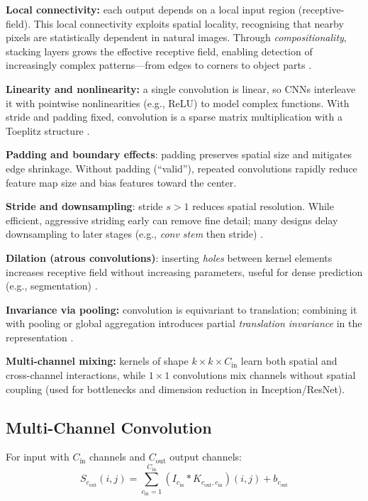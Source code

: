 \textbf{Local connectivity:} each output depends on a local input region (\gls{receptive-field}). This local connectivity exploits spatial locality, recognising that nearby pixels are statistically dependent in natural images. Through \emph{compositionality}, stacking layers grows the effective receptive field, enabling detection of increasingly complex patterns—from edges to corners to object parts \cite{GoodfellowEtAl2016}.

\textbf{Linearity and nonlinearity:} a single convolution is linear, so CNNs interleave it with pointwise nonlinearities (e.g., ReLU) to model complex functions. With stride and padding fixed, convolution is a sparse matrix multiplication with a Toeplitz structure \cite{GoodfellowEtAl2016}.

\textbf{Padding and boundary effects}: padding preserves spatial size and mitigates edge shrinkage. Without padding (``valid''), repeated convolutions rapidly reduce feature map size and bias features toward the center.

\textbf{Stride and downsampling}: stride \(s>1\) reduces spatial resolution. While efficient, aggressive striding early can remove fine detail; many designs delay downsampling to later stages (e.g., \textit{conv stem} then stride) \cite{Krizhevsky2012,He2016}.

\textbf{Dilation (atrous convolutions)}: inserting \emph{holes} between kernel elements increases receptive field without increasing parameters, useful for dense prediction (e.g., segmentation) \cite{GoodfellowEtAl2016}.

\textbf{Invariance via pooling:} convolution is equivariant to translation; combining it with pooling or global aggregation introduces partial \emph{translation invariance} in the representation \cite{GoodfellowEtAl2016}.

\textbf{Multi-channel mixing:} kernels of shape \(k\times k\times C_{\text{in}}\) learn both spatial and cross-channel interactions, while $1\times1$ convolutions mix channels without spatial coupling (used for bottlenecks and dimension reduction in Inception/ResNet).

\subsection{Multi-Channel Convolution}

For input with $C_{\text{in}}$ channels and $C_{\text{out}}$ output channels:
\begin{equation}
S_{c_{\text{out}}}(i,j) = \sum_{c_{\text{in}}=1}^{C_{\text{in}}} (I_{c_{\text{in}}} * K_{c_{\text{out}}, c_{\text{in}}})(i,j) + b_{c_{\text{out}}}
\end{equation}

